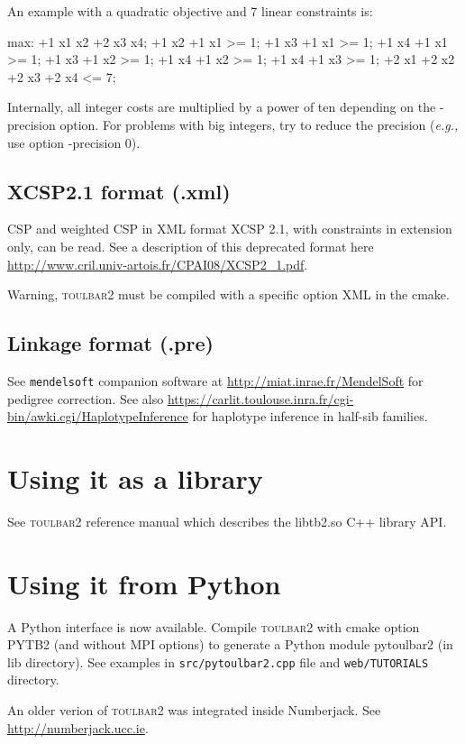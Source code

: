 \documentclass{article}
\def\toulbar2{\textsc{toulbar2}}
\begin{document}
An example with a quadratic objective and 7 linear constraints is:
\begin{DoxyCode}
max: +1 x1 x2 +2 x3 x4;
+1 x2 +1 x1 >= 1;
+1 x3 +1 x1 >= 1;
+1 x4 +1 x1 >= 1;
+1 x3 +1 x2 >= 1;
+1 x4 +1 x2 >= 1;
+1 x4 +1 x3 >= 1;
+2 x1 +2 x2 +2 x3 +2 x4 <= 7;
\end{DoxyCode}

Internally, all integer costs are multiplied by a power of ten depending on the -precision option. 
For problems with big integers, try to reduce the precision ({\em e.g.,} use option -precision 0).

\subsection{XCSP2.1 format (.xml)}

CSP and weighted CSP in XML format XCSP 2.1, with constraints in extension only, can be read. See a description of this deprecated format here \url{http://www.cril.univ-artois.fr/CPAI08/XCSP2_1.pdf}.

Warning, \toulbar2 must be compiled with a specific option XML in the cmake.

\subsection{Linkage format (.pre)}

See \texttt{mendelsoft} companion software at \url{http://miat.inrae.fr/MendelSoft} for pedigree correction. See also \url{https://carlit.toulouse.inra.fr/cgi-bin/awki.cgi/HaplotypeInference} for haplotype inference in half-sib families.


\section{Using it as a library}

See \toulbar2 reference manual which describes the libtb2.so C++ library API.

\section{Using it from Python}

A Python interface is now available. Compile \toulbar2 with cmake option PYTB2 (and without MPI options) to generate a Python module {\sc pytoulbar2}
 (in lib directory). See examples in {\tt src/pytoulbar2.cpp} file and {\tt web/TUTORIALS} directory.

An older verion of \toulbar2 was integrated inside Numberjack. See  \url{http://numberjack.ucc.ie}.



\end{document}
